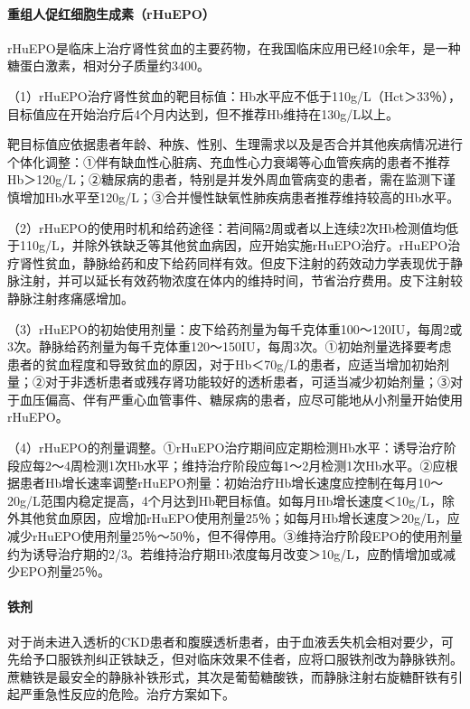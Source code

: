 \paragraph{重组人促红细胞生成素（rHuEPO）}

rHuEPO是临床上治疗肾性贫血的主要药物，在我国临床应用已经10余年，是一种糖蛋白激素，相对分子质量约3400。

（1）rHuEPO治疗肾性贫血的靶目标值：Hb水平应不低于110g/L（Hct＞33％），目标值应在开始治疗后4个月内达到，但不推荐Hb维持在130g/L以上。

靶目标值应依据患者年龄、种族、性别、生理需求以及是否合并其他疾病情况进行个体化调整：①伴有缺血性心脏病、充血性心力衰竭等心血管疾病的患者不推荐Hb＞120g/L；②糖尿病的患者，特别是并发外周血管病变的患者，需在监测下谨慎增加Hb水平至120g/L；③合并慢性缺氧性肺疾病患者推荐维持较高的Hb水平。

（2）rHuEPO的使用时机和给药途径：若间隔2周或者以上连续2次Hb检测值均低于110g/L，并除外铁缺乏等其他贫血病因，应开始实施rHuEPO治疗。rHuEPO治疗肾性贫血，静脉给药和皮下给药同样有效。但皮下注射的药效动力学表现优于静脉注射，并可以延长有效药物浓度在体内的维持时间，节省治疗费用。皮下注射较静脉注射疼痛感增加。

（3）rHuEPO的初始使用剂量：皮下给药剂量为每千克体重100～120IU，每周2或3次。静脉给药剂量为每千克体重120～150IU，每周3次。①初始剂量选择要考虑患者的贫血程度和导致贫血的原因，对于Hb＜70g/L的患者，应适当增加初始剂量；②对于非透析患者或残存肾功能较好的透析患者，可适当减少初始剂量；③对于血压偏高、伴有严重心血管事件、糖尿病的患者，应尽可能地从小剂量开始使用rHuEPO。

（4）rHuEPO的剂量调整。①rHuEPO治疗期间应定期检测Hb水平：诱导治疗阶段应每2～4周检测1次Hb水平；维持治疗阶段应每1～2月检测1次Hb水平。②应根据患者Hb增长速率调整rHuEPO剂量：初始治疗Hb增长速度应控制在每月10～20g/L范围内稳定提高，4个月达到Hb靶目标值。如每月Hb增长速度＜10g/L，除外其他贫血原因，应增加rHuEPO使用剂量25％；如每月Hb增长速度＞20g/L，应减少rHuEPO使用剂量25％～50％，但不得停用。③维持治疗阶段EPO的使用剂量约为诱导治疗期的2/3。若维持治疗期Hb浓度每月改变＞10g/L，应酌情增加或减少EPO剂量25％。
\paragraph{铁剂}

对于尚未进入透析的CKD患者和腹膜透析患者，由于血液丢失机会相对要少，可先给予口服铁剂纠正铁缺乏，但对临床效果不佳者，应将口服铁剂改为静脉铁剂。蔗糖铁是最安全的静脉补铁形式，其次是葡萄糖酸铁，而静脉注射右旋糖酐铁有引起严重急性反应的危险。治疗方案如下。

